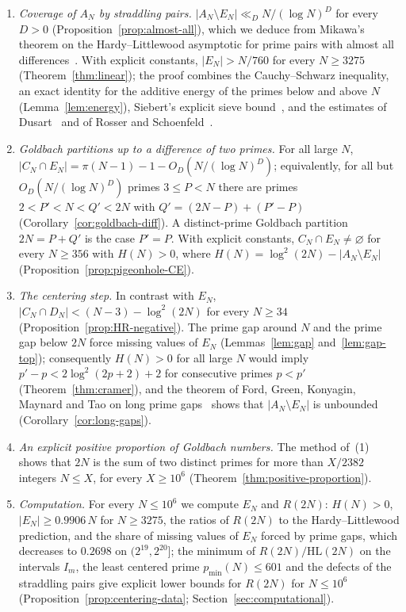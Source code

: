 \documentclass[11pt]{amsart}
\theoremstyle{definition}
\theoremstyle{remark}
\begin{document}
\begin{enumerate}
\item[\emph{(1)}] \emph{Coverage of $A_N$ by straddling pairs.} $|A_N\setminus E_N|\ll_D N/(\log N)^D$ for every $D>0$ (Proposition~\ref{prop:almost-all}), which we deduce from Mikawa's theorem on the Hardy--Littlewood asymptotic for prime pairs with almost all differences~\cite{mikawa1991prime}. With explicit constants, $|E_N|>N/760$ for every $N\geq 3275$ (Theorem~\ref{thm:linear}); the proof combines the Cauchy--Schwarz inequality, an exact identity for the additive energy of the primes below and above $N$ (Lemma~\ref{lem:energy}), Siebert's explicit sieve bound~\cite{siebert1976montgomery}, and the estimates of Dusart~\cite{dusart1998autour} and of Rosser and Schoenfeld~\cite{rosser1962approximate}.
\item[\emph{(2)}] \emph{Goldbach partitions up to a difference of two primes.} For all large $N$, $|C_N\cap E_N|=\pi(N-1)-1-O_D(N/(\log N)^D)$; equivalently, for all but $O_D(N/(\log N)^D)$ primes $3\leq P<N$ there are primes $2<P'<N<Q'<2N$ with $Q'=(2N-P)+(P'-P)$ (Corollary~\ref{cor:goldbach-diff}). A distinct-prime Goldbach partition $2N=P+Q'$ is the case $P'=P$. With explicit constants, $C_N\cap E_N\neq\varnothing$ for every $N\geq 356$ with $H(N)>0$, where $H(N)=\log^2(2N)-|A_N\setminus E_N|$ (Proposition~\ref{prop:pigeonhole-CE}).
\item[\emph{(3)}] \emph{The centering step.} In contrast with $E_N$, $|C_N\cap D_N|<(N-3)-\log^2(2N)$ for every $N\geq 34$ (Proposition~\ref{prop:HR-negative}). The prime gap around $N$ and the prime gap below $2N$ force missing values of $E_N$ (Lemmas~\ref{lem:gap} and~\ref{lem:gap-top}); consequently $H(N)>0$ for all large $N$ would imply $p'-p<2\log^2(2p+2)+2$ for consecutive primes $p<p'$ (Theorem~\ref{thm:cramer}), and the theorem of Ford, Green, Konyagin, Maynard and Tao on long prime gaps~\cite{ford2018long} shows that $|A_N\setminus E_N|$ is unbounded (Corollary~\ref{cor:long-gaps}).
\item[\emph{(4)}] \emph{An explicit positive proportion of Goldbach numbers.} The method of~(1) shows that $2N$ is the sum of two distinct primes for more than $X/2382$ integers $N\leq X$, for every $X\geq 10^6$ (Theorem~\ref{thm:positive-proportion}).
\item[\emph{(5)}] \emph{Computation.} For every $N\leq 10^6$ we compute $E_N$ and $R(2N)$: $H(N)>0$, $|E_N|\geq 0.9906\,N$ for $N\geq 3275$, the ratios of $R(2N)$ to the Hardy--Littlewood prediction, and the share of missing values of $E_N$ forced by prime gaps, which decreases to $0.2698$ on $(2^{19},2^{20}]$; the minimum of $R(2N)/\mathrm{HL}(2N)$ on the intervals $I_m$, the least centered prime $p_{\min}(N)\leq 601$ and the defects of the straddling pairs give explicit lower bounds for $R(2N)$ for $N\leq 10^6$ (Proposition~\ref{prop:centering-data}; Section~\ref{sec:computational}).
\end{enumerate}
\end{document}

